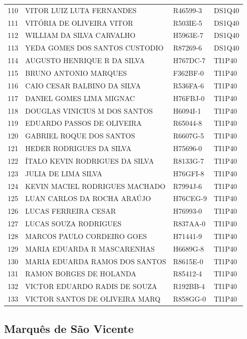 \documentclass[
]{book}
\begin{document}
\begin{longtable}[]{@{}llll@{}}
110 & VITOR LUIZ LUTA FERNANDES & R46599-3 & DS1Q40 \\
111 & VITÓRIA DE OLIVEIRA VITOR & R503IE-5 & DS1Q40 \\
112 & WILLIAM DA SILVA CARVALHO & H5963E-7 & DS1Q40 \\
113 & YEDA GOMES DOS SANTOS CUSTODIO & R87269-6 & DS1Q40 \\
114 & AUGUSTO HENRIQUE R DA SILVA & H767DC-7 & TI1P40 \\
115 & BRUNO ANTONIO MARQUES & F362BF-0 & TI1P40 \\
116 & CAIO CESAR BALBINO DA SILVA & R536FA-6 & TI1P40 \\
117 & DANIEL GOMES LIMA MIGNAC & H76FBJ-0 & TI1P40 \\
118 & DOUGLAS VINICIUS M DOS SANTOS & H6094I-1 & TI1P40 \\
119 & EDUARDO PASSOS DE OLIVEIRA & R65044-8 & TI1P40 \\
120 & GABRIEL ROQUE DOS SANTOS & R6607G-5 & TI1P40 \\
121 & HEDER RODRIGUES DA SILVA & H75696-0 & TI1P40 \\
122 & ÍTALO KEVIN RODRIGUES DA SILVA & R8133G-7 & TI1P40 \\
123 & JULIA DE LIMA SILVA & H76GFI-8 & TI1P40 \\
124 & KEVIN MACIEL RODRIGUES MACHADO & R7994J-6 & TI1P40 \\
125 & LUAN CARLOS DA ROCHA ARAÚJO & H76CEG-9 & TI1P40 \\
126 & LUCAS FERREIRA CESAR & H76993-0 & TI1P40 \\
127 & LUCAS SOUZA RODRIGUES & R837AA-0 & TI1P40 \\
128 & MARCOS PAULO CORDEIRO GOES & H71441-9 & TI1P40 \\
129 & MARIA EDUARDA R MASCARENHAS & H6689G-8 & TI1P40 \\
130 & MARIA EDUARDA RAMOS DOS SANTOS & R8615E-0 & TI1P40 \\
131 & RAMON BORGES DE HOLANDA & R85412-4 & TI1P40 \\
132 & VICTOR EDUARDO RADIS DE SOUZA & R192BB-4 & TI1P40 \\
133 & VICTOR SANTOS DE OLIVEIRA MARQ & R858GG-0 & TI1P40 \\
\end{longtable}

\subsection{Marquês de São Vicente}\label{marquuxeas-de-suxe3o-vicente-1}
\end{document}
